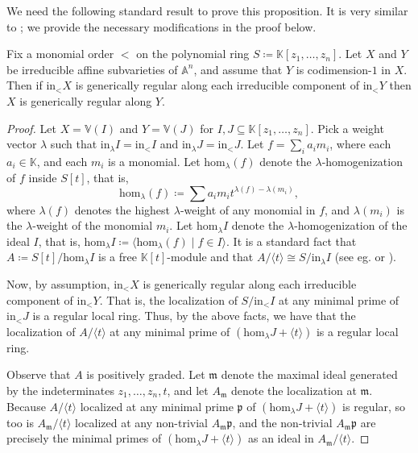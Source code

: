 \documentclass[ALCO,published]{cedram}
\numberwithin{equation}{section}
\newcommand{\1}{^{-1}}
\begin{document}
We need the following standard result to prove this proposition.  It is very similar to \cite[Proposition 3.1 (b)]{BC03}; we provide the necessary modifications in the proof below.

\begin{lem}
Fix a monomial order $<$ on the polynomial ring $S \coloneqq \mathbb{K}[z_1,\dots,z_n]$. 
Let $X$ and $Y$ be irreducible affine subvarieties of $\mathbb{A}^n$, and assume that $Y$ is codimension-$1$ in $X$. 
Then if $\textrm{in}_< X$ is generically regular along each irreducible component of $\textrm{in}_< Y$ then $X$ is generically regular along $Y$.
\end{lem}

\begin{proof}
Let $X = \mathbb{V}(I)$ and $Y = \mathbb{V}(J)$ for $I,J\subseteq \mathbb{K}[z_1,\dots, z_n]$.
Pick a weight vector $\lambda$ such that $\textrm{in}_\lambda I = \textrm{in}_< I$ and $\textrm{in}_\lambda J = \textrm{in}_< J$.
Let $f = \sum_i a_im_i$, where each $a_i\in \mathbb{K}$, and each $m_i$ is a monomial. Let $\textrm{hom}_{\lambda}(f)$ denote the $\lambda$-homogenization of $f$ inside $S[t]$, that is,
\[\textrm{hom}_\lambda(f) \coloneqq \sum a_im_it^{\lambda(f)-\lambda(m_i)},\] where $\lambda(f)$ denotes the highest $\lambda$-weight of any monomial in $f$, and $\lambda(m_i)$ is the $\lambda$-weight of the monomial $m_i$.
Let $\textrm{hom}_\lambda I$ denote the $\lambda$-homogenization of the ideal $I$, that is,
$\textrm{hom}_\lambda I \coloneqq \langle \textrm{hom}_\lambda(f) \mid f\in I \rangle.$ %
It is a standard fact that $A \coloneqq S[t]/\textrm{hom}_{\lambda} I$ is a free $\mathbb{K}[t]$-module and that $A/\langle t\rangle \cong S/\textrm{in}_{\lambda} I$ (see eg. \cite[Proposition 2.4]{BC03} or \cite[Theorem 15.17]{Eis95}).

Now, by assumption, $\textrm{in}_< X$ is generically regular along each irreducible component of $\textrm{in}_< Y$. That is, the localization of $S/\textrm{in}_{<} I$ at any minimal prime of $\textrm{in}_< J$ is a regular local ring. 
Thus, by the above facts, we have that the localization of $A/\langle t\rangle$ at any minimal prime of $(\textrm{hom}_\lambda J+\langle t\rangle)$ is a regular local ring. 

Observe that $A$ is positively graded. Let $\mathfrak{m}$ denote the maximal ideal generated by the indeterminates $z_1,\dots,z_n,t$, and let $A_{\mathfrak{m}}$ denote the localization at $\mathfrak{m}$. 
Because $A/\langle t \rangle$ localized at any minimal prime $\mathfrak{p}$ of $(\textrm{hom}_\lambda J+\langle t\rangle)$ is regular, so too is $A_\mathfrak{m}/\langle t\rangle$ localized at any non-trivial $A_\mathfrak{m} \mathfrak{p}$, and the non-trivial $A_\mathfrak{m}\mathfrak{p}$ are precisely the minimal primes of $(\textrm{hom}_\lambda J+\langle t\rangle)$ as an ideal in $A_\mathfrak{m}/\langle t\rangle$.


\end{proof}
\end{document}
